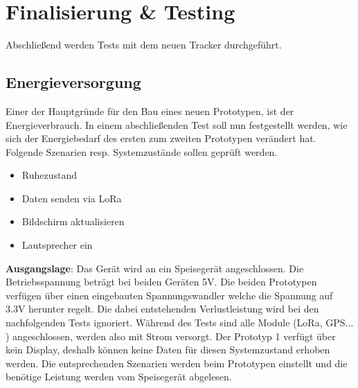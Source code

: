 \documentclass[11pt,english,german]{report}
\theoremstyle{definition}
\begin{document}
\newpage
\section{Finalisierung \& Testing}
Abschließend werden Tests mit dem neuen Tracker durchgeführt.

\subsection{Energieversorgung}
Einer der Hauptgründe für den Bau eines neuen Prototypen, ist der Energieverbrauch. In einem abschließenden Test soll nun festgestellt werden, wie sich der Energiebedarf des ersten zum zweiten Prototypen verändert hat. Folgende Szenarien resp. Systemzustände sollen geprüft werden.
\begin{itemize}
	\item Ruhezustand
	\item Daten senden via LoRa
	\item Bildschirm aktualisieren
	\item Lautsprecher ein	
\end{itemize}
\textbf{Ausgangslage}: Das Gerät wird an ein Speisegerät angeschlossen. Die Betriebsspannung beträgt bei beiden Geräten 5V. Die beiden Prototypen verfügen über einen eingebauten Spannungswandler welche die Spannung auf 3.3V herunter regelt. Die dabei entstehenden Verlustleistung wird bei den nachfolgenden Tests ignoriert. Während des Tests sind alle Module (LoRa, GPS... ) angeschlossen, werden also mit Strom versorgt. Der Prototyp 1 verfügt über kein Display, deshalb können keine Daten für diesen Systemzustand erhoben werden. Die entsprechenden Szenarien werden beim Prototypen einstellt und die benötige Leistung werden vom Speisegerät abgelesen.
\end{document}
